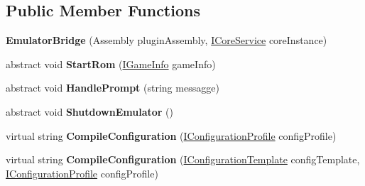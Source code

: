 \subsection*{Public Member Functions}
\begin{DoxyCompactItemize}
\item 
\hypertarget{class_snowflake_1_1_emulator_1_1_emulator_bridge_a46acb4aff8c003cc5b0d42b30dc8cd51}{}{\bfseries Emulator\+Bridge} (Assembly plugin\+Assembly, \hyperlink{interface_snowflake_1_1_service_1_1_i_core_service}{I\+Core\+Service} core\+Instance)\label{class_snowflake_1_1_emulator_1_1_emulator_bridge_a46acb4aff8c003cc5b0d42b30dc8cd51}

\item 
\hypertarget{class_snowflake_1_1_emulator_1_1_emulator_bridge_ab490b050c553a114bad5a060dfed8e2f}{}abstract void {\bfseries Start\+Rom} (\hyperlink{interface_snowflake_1_1_game_1_1_i_game_info}{I\+Game\+Info} game\+Info)\label{class_snowflake_1_1_emulator_1_1_emulator_bridge_ab490b050c553a114bad5a060dfed8e2f}

\item 
\hypertarget{class_snowflake_1_1_emulator_1_1_emulator_bridge_acd1ee415922abfd0313929009858b2b4}{}abstract void {\bfseries Handle\+Prompt} (string messagge)\label{class_snowflake_1_1_emulator_1_1_emulator_bridge_acd1ee415922abfd0313929009858b2b4}

\item 
\hypertarget{class_snowflake_1_1_emulator_1_1_emulator_bridge_a19b6a6f5152034a83365a8a9ea8a03ce}{}abstract void {\bfseries Shutdown\+Emulator} ()\label{class_snowflake_1_1_emulator_1_1_emulator_bridge_a19b6a6f5152034a83365a8a9ea8a03ce}

\item 
\hypertarget{class_snowflake_1_1_emulator_1_1_emulator_bridge_a375d797ed11753acd00ae51a45deeaa8}{}virtual string {\bfseries Compile\+Configuration} (\hyperlink{interface_snowflake_1_1_emulator_1_1_configuration_1_1_i_configuration_profile}{I\+Configuration\+Profile} config\+Profile)\label{class_snowflake_1_1_emulator_1_1_emulator_bridge_a375d797ed11753acd00ae51a45deeaa8}

\item 
\hypertarget{class_snowflake_1_1_emulator_1_1_emulator_bridge_ab91a1f58daf7c7474155278db611ad2d}{}virtual string {\bfseries Compile\+Configuration} (\hyperlink{interface_snowflake_1_1_emulator_1_1_configuration_1_1_i_configuration_template}{I\+Configuration\+Template} config\+Template, \hyperlink{interface_snowflake_1_1_emulator_1_1_configuration_1_1_i_configuration_profile}{I\+Configuration\+Profile} config\+Profile)\label{class_snowflake_1_1_emulator_1_1_emulator_bridge_ab91a1f58daf7c7474155278db611ad2d}


\end{DoxyCompactItemize}

